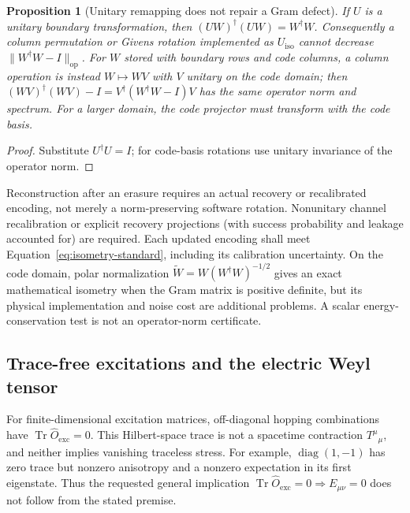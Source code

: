 \documentclass[11pt,a4paper]{article}
\newtheorem{proposition}[theorem]{Proposition}
\newcommand{\Tr}{\operatorname{Tr}}
\newcommand{\op}{\mathrm{op}}
\begin{document}
\begin{proposition}[Unitary remapping does not repair a Gram defect]
\label{prop:gram}
If $U$ is a unitary boundary transformation, then
$(UW)^\dagger(UW)=W^\dagger W$. Consequently a column permutation or Givens rotation
implemented as $U_{\mathrm{iso}}$ cannot decrease $\|W^\dagger W-I\|_\op$.
For $W$ stored with boundary rows and code columns, a column operation is instead
$W\mapsto WV$ with $V$ unitary on the code domain; then
$(WV)^\dagger(WV)-I=V^\dagger(W^\dagger W-I)V$ has the same operator norm and spectrum.
For a larger domain, the code projector must transform with the code basis.
\end{proposition}
\begin{proof}
Substitute $U^\dagger U=I$; for code-basis rotations use unitary invariance of the operator norm.
\end{proof}
Reconstruction after an erasure requires an actual recovery or recalibrated encoding, not
merely a norm-preserving software rotation. Nonunitary channel recalibration or explicit
recovery projections (with success probability and leakage accounted for) are required.
Each updated encoding shall meet Equation~\ref{eq:isometry-standard}, including
its calibration uncertainty. On the code domain, polar normalization
$\widetilde W=W(W^\dagger W)^{-1/2}$ gives an exact mathematical isometry when the Gram matrix
is positive definite, but its physical implementation and noise cost are additional problems.
A scalar energy-conservation test is not an operator-norm certificate.

\subsection{Trace-free excitations and the electric Weyl tensor}
\label{sec:weyl}
For finite-dimensional excitation matrices, off-diagonal hopping combinations have
$\Tr\hat O_{\mathrm{exc}}=0$. This Hilbert-space trace is not a spacetime contraction
$T^\mu{}_{\mu}$, and neither implies vanishing traceless stress. For example,
$\operatorname{diag}(1,-1)$ has zero trace but nonzero anisotropy and a nonzero expectation
in its first eigenstate. Thus the requested general implication
$\Tr\hat O_{\mathrm{exc}}=0\Rightarrow E_{\mu\nu}=0$ does not follow from the stated premise.
\end{document}
